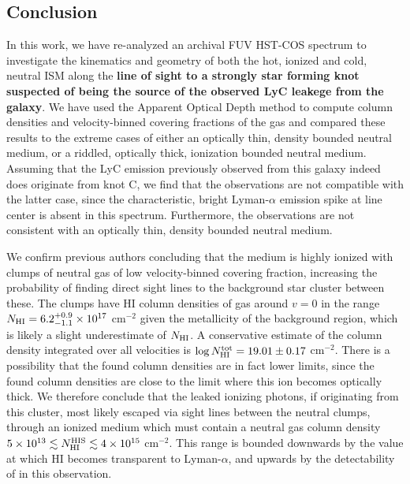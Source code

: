 \documentclass[twocolumn, trackchanges]{aastex61}
\begin{document}
\subsection{Conclusion}\label{conclusion}

In this work, we have re-analyzed an archival FUV HST-COS spectrum to
investigate the kinematics and geometry of both the hot, ionized and
cold, neutral ISM along the \textbf{line of sight to a strongly star forming
knot suspected of being the source of the observed LyC leakege from
the galaxy}. We have used the Apparent Optical Depth method to compute column 
densities and velocity-binned covering fractions of the gas and compared these 
results to the extreme cases of either an optically thin, density bounded
neutral medium, or a riddled, optically thick, ionization bounded
neutral medium. Assuming that the LyC emission previously
observed from this galaxy indeed does originate from knot C, we find
that the observations are not compatible with the latter case, since the
characteristic, bright Lyman-$\alpha$ emission spike at line center is
absent in this spectrum. Furthermore, the observations are not
consistent with an optically thin, density bounded neutral medium.

We confirm previous authors concluding that the medium is highly ionized
with clumps of neutral gas of low velocity-binned covering fraction,
increasing the probability of finding direct sight lines to the
background star cluster between these. The clumps have HI column
densities of gas around $v=0$ in the range
$N_{\rm HI} = 6.2^{+0.9}_{-1.1} \times 10^{17}$ cm$^{-2}$ given the 
metallicity of the background  region, which is likely a slight 
underestimate of $N_{\rm HI}$. A conservative estimate of the  column
density integrated over all velocities is
$\log N_{\rm H I}^{\rm tot} = 19.01 \pm 0.17$ cm$^{-2}$. There is a possibility
that the found column densities are in fact lower limits, since the
found  column densities are close to the limit where this ion
becomes optically thick. We therefore conclude that the leaked ionizing
photons, if originating from this cluster, most likely escaped via sight
lines between the neutral clumps, through an ionized medium which must
contain a neutral gas column density
$5 \times 10^{13} \lesssim N_{\rm HI}^{\rm HIS} \lesssim 4 \times 10^{15}$
cm$^{-2}$. This range is bounded downwards by the value at which HI becomes
transparent to Lyman-$\alpha$, and upwards by the detectability of
 in this observation.
\end{document}
